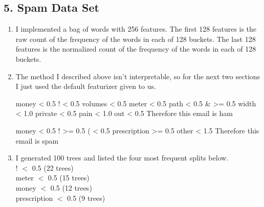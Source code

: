 \documentclass{article}
\begin{document}
\subsection*{5. Spam Data Set}
\begin{enumerate}[label=\alph*)]
\item
I implemented a bag of words with 256 features. The first 128 features is the raw count of the frequency of the words in each of 128 buckets. The last 128 features
is the normalized count of the frequency of the words in each of 128 buckets.

\item
The method I described above isn't interpretable, so for the next two sections I just used the default featurizer given to us.
\begin{python}
money < 0.5
! < 0.5
volumes < 0.5
meter < 0.5
path < 0.5
& >= 0.5
width < 1.0
private < 0.5
pain < 1.0
out < 0.5
Therefore this email is ham

money < 0.5
! >= 0.5
( < 0.5
prescription >= 0.5
other < 1.5
Therefore this email is spam
\end{python}

\item
I generated 100 trees and listed the four most frequent splits below.\\
! $<$ 0.5 (22 trees)\\
meter $<$ 0.5 (15 trees)\\
money $<$ 0.5 (12 trees)\\
prescription $<$ 0.5 (9 trees)\\

\end{enumerate}

\newpage
\end{document}
